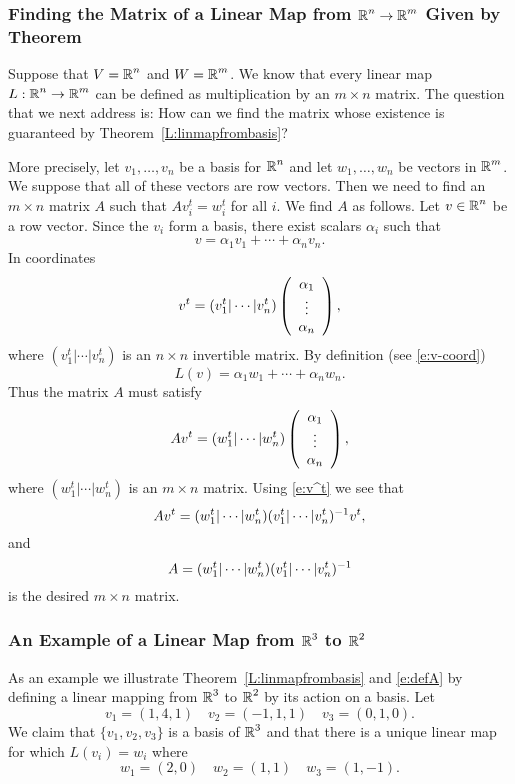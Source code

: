 \documentclass{ximera}
\begin{document}
\subsubsection*{Finding the Matrix of a Linear Map from $\mbox{$\Bbb{R}$}^n\to\mbox{$\Bbb{R}$}^m$
Given by Theorem~\protect{\ref{L:linmapfrombasis}}}

Suppose that $V=\mbox{$\Bbb{R}$}^n$ and $W=\mbox{$\Bbb{R}$}^m$.  We know that every linear
map $L:\mbox{$\Bbb{R}$}^n\to\mbox{$\Bbb{R}$}^m$ can be defined as multiplication by an
$m\times n$ matrix.  The question that we next address is:
How can we find the matrix whose existence is guaranteed by
Theorem~\ref{L:linmapfrombasis}?

More precisely, let $v_1,\ldots,v_n$ be a basis for $\mbox{$\Bbb{R}$}^n$ and
let $w_1,\ldots,w_n$ be vectors in $\mbox{$\Bbb{R}$}^m$.  We suppose that all
of these vectors are row vectors.  Then we need to find
an $m\times n$ matrix $A$ such that $Av_i^t=w_i^t$ for all $i$.
We find $A$ as follows.  Let $v\in\mbox{$\Bbb{R}$}^n$ be a row vector.  Since
the $v_i$ form a basis, there exist scalars $\alpha_i$ such that
\[
v=\alpha_1 v_1 + \cdots + \alpha_n v_n.
\]
In coordinates
\begin{equation}  \label{e:v^t}
v^t = (v_1^t|\cdots|v_n^t)\left(\begin{array}{c} \alpha_1 \\ \vdots \\ \alpha_{n}\end{array}\right),
\end{equation}
where $(v_1^t|\cdots|v_n^t)$ is an $n\times n$
invertible matrix.
By definition (see \eqref{e:v-coord})
\[
L(v) = \alpha_1 w_1 + \cdots + \alpha_n w_n.
\]
Thus the matrix $A$ must satisfy
\[
Av^t = (w_1^t|\cdots|w_n^t)\left(\begin{array}{c} \alpha_1 \\ \vdots \\ \alpha_{n}\end{array}\right),
\]
where $(w_1^t|\cdots|w_n^t)$ is an $m\times n$ matrix.
Using \eqref{e:v^t} we see that
\[
Av^t = (w_1^t|\cdots|w_n^t)(v_1^t|\cdots|v_n^t)^{-1} v^t,
\]
and
\begin{equation}  \label{e:defA}
A = (w_1^t|\cdots|w_n^t)(v_1^t|\cdots|v_n^t)^{-1}
\end{equation}
is the desired $m\times n$ matrix.

\subsubsection*{An Example of a Linear Map from $\mbox{$\Bbb{R}$}^3$ to $\mbox{$\Bbb{R}$}^2$}

As an example we illustrate Theorem~\ref{L:linmapfrombasis} and
\eqref{e:defA} by defining a linear mapping from $\mbox{$\Bbb{R}$}^3$ to $\mbox{$\Bbb{R}$}^2$
by its action on a basis.  Let
\[
v_1=(1,4,1)\quad v_2=(-1,1,1) \quad v_3=(0,1,0).
\]
We claim that $\{v_1,v_2,v_3\}$ is a basis of $\mbox{$\Bbb{R}$}^3$ and that
there is a unique linear map for which $L(v_i)=w_i$ where
\[
w_1=(2,0) \quad w_2=(1,1) \quad w_3=(1,-1).
\]
\end{document}
